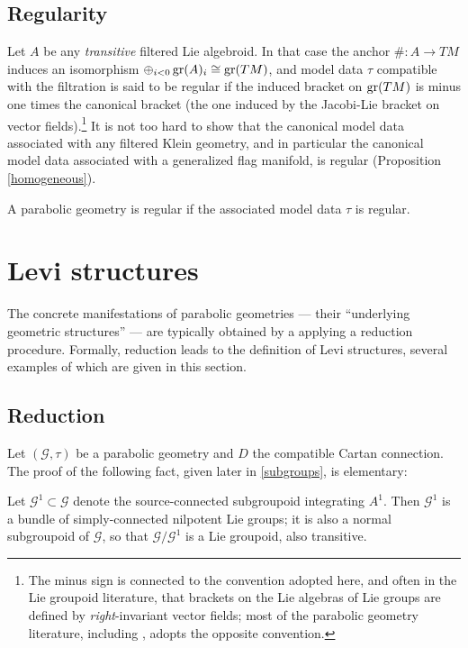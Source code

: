 \documentclass[leqno,12pt]{amsart} %
\newcommand\refreshpage{\newpage}
\newcommand\refreshpage{}
\begin{document}
\subsection{Regularity}\label{regularity_}
Let $A$ be any {\em transitive} filtered Lie algebroid. In that case the anchor
$\# \colon A \rightarrow TM$ induces an isomorphism
$\oplus_{i<0}\operatorname{\operatorname{gr}}(A)_i \cong \operatorname{\operatorname{gr}}(TM)$, and model data $\tau $ compatible with the
filtration is said to be {\df regular} if the induced bracket on $\operatorname{\operatorname{gr}}(TM)$ is minus
one times the canonical bracket (the one induced by the Jacobi-Lie bracket on vector
fields).\footnote{The minus sign is connected to the convention adopted here,
  and often in the Lie groupoid literature, that brackets on the Lie algebras of Lie groups are
  defined by {\em right}-invariant vector fields; most of the parabolic geometry literature, including \cite{Cap_Slovak_09}, adopts the opposite convention.} It is not too hard to show that the
canonical model data associated with any filtered Klein geometry, and in particular the
canonical model data associated with a generalized flag manifold, is regular (Proposition
\ref{homogeneous}).

A parabolic geometry is {\df regular} if the associated model data $\tau $ is regular.

\refreshpage
\section{Levi structures}\label{levisection}
The concrete manifestations of parabolic geometries --- their ``underlying geometric
structures'' --- are typically obtained by a applying a reduction procedure. Formally,
reduction leads to the definition of Levi structures, several examples of which are given
in this section.

\subsection{Reduction}\label{reduction_}
Let $({\mathcal G}, \tau)$ be a parabolic geometry and $D$ the compatible Cartan
connection. The proof of the following fact, given later in \ref{subgroups}, is
elementary:

\begin{proposition}
  Let ${\mathcal G}^1 \subset {\mathcal G} $ denote the source-connected subgroupoid
  integrating $A^1$.  Then ${\mathcal G}^1 $ is a bundle of simply-connected nilpotent Lie
  groups; it is also a normal subgroupoid of ${\mathcal G}$, so that
  ${\mathcal G}/{\mathcal G}^1$ is a Lie groupoid, also transitive.
\end{proposition}
\end{document}
